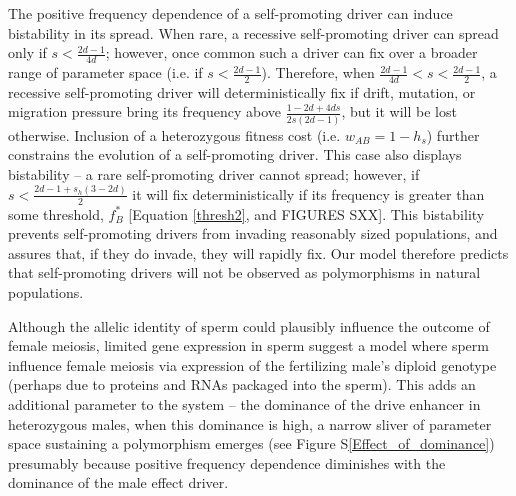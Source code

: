 \documentclass[12pt,letterpaper]{article}
\newcommand{\yb}[1]{{ \color{blue} #1}}
\begin{document}
The positive frequency dependence of a self-promoting driver can induce bistability in its spread. 
When rare, a  recessive self-promoting driver can spread only if $s < \frac{2 d - 1}{4 d}$;
	however, once common such a driver can fix over a broader range of parameter space (i.e. if $s<\frac{2d-1}{2}$). 
Therefore, when $\frac{2 d - 1}{4 d}<s<\frac{2d-1}{2}$, 
	a recessive self-promoting driver will deterministically fix if drift, mutation, 
	or migration pressure bring its frequency above $\frac{1-2d+4ds}{2s(2d-1)}$, 
	but it will be lost otherwise.
Inclusion of a heterozygous fitness cost (i.e. $w_{AB}=1-h_s$)
	further constrains the evolution of a self-promoting driver. 
This case also displays bistability -- a rare self-promoting driver cannot spread; 
	however, if $s < \frac{2 d - 1+s_h(3-2d)}{2}$ it will fix deterministically if its 
	frequency is greater than some threshold, $f_B^*$ [Equation \eqref{thresh2}, and \yb{FIGURES SXX}].
This bistability prevents self-promoting drivers from invading 	
	reasonably sized populations, and assures that, if they do invade, they will rapidly fix.
Our model therefore predicts that self-promoting drivers will not be observed as polymorphisms in natural populations. 


Although the allelic identity of sperm could plausibly influence the outcome of female meiosis, 
	limited gene expression in sperm \citep[e.g.][]{Joseph2004}
	suggest a model where sperm influence female meiosis via expression of the fertilizing male's
	diploid genotype (perhaps due to proteins and RNAs packaged into the sperm).
This adds an additional parameter to the system -- the dominance of the drive enhancer in heterozygous males, 
	when this dominance is high, a narrow sliver of parameter space sustaining a polymorphism emerges (see Figure S\ref{Effect_of_dominance})
 presumably because positive frequency dependence diminishes with the dominance of the male effect driver.
\end{document}
